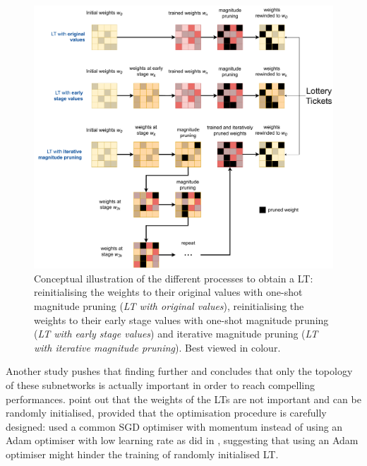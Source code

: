 \begin{figure}[htbp]
  \centering
  \includegraphics[width=\textwidth]{chapter_2/assets/LT_schemes.pdf}
  \caption{Conceptual illustration of the different processes to obtain a
  \acl{LT}: reinitialising the weights to their original values with one-shot
  magnitude pruning (\emph{LT with original values}), reinitialising the weights
  to their early stage values with one-shot magnitude pruning (\emph{LT with
  early stage values}) and iterative magnitude pruning (\emph{LT with iterative
  magnitude pruning}). Best viewed in colour.}
  \label{fig:chap2:lt_schemes}
\end{figure}

Another study \cite{DBLP:conf/iclr/LiuSZHD19} pushes that finding further and
concludes that only the topology of these subnetworks is actually important in
order to reach compelling performances. \citeauthor{DBLP:conf/iclr/LiuSZHD19}
\cite{DBLP:conf/iclr/LiuSZHD19} point out that the weights of the \acp{LT} are
not important and can be randomly initialised, provided that the optimisation
procedure is carefully designed: \citeauthor{DBLP:conf/iclr/LiuSZHD19} used a
common \ac{SGD} optimiser with momentum instead of using an Adam optimiser
\cite{kingma2014adam} with low learning rate as
\citeauthor{DBLP:conf/iclr/FrankleC19} did in \cite{DBLP:conf/iclr/FrankleC19},
suggesting that using an Adam optimiser might hinder the training of randomly
initialised \ac{LT}.\\

